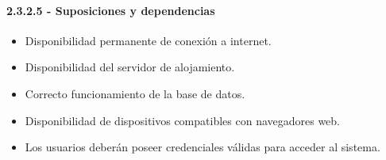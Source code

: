 \paragraph{2.3.2.5 - Suposiciones y dependencias}

\begin{itemize}
    \item Disponibilidad permanente de conexión a internet.   
    \item Disponibilidad del servidor de alojamiento.   
    \item Correcto funcionamiento de la base de datos.   
    \item Disponibilidad de dispositivos compatibles con navegadores web.   
    \item Los usuarios deberán poseer credenciales válidas para acceder al sistema. 
\end{itemize}
